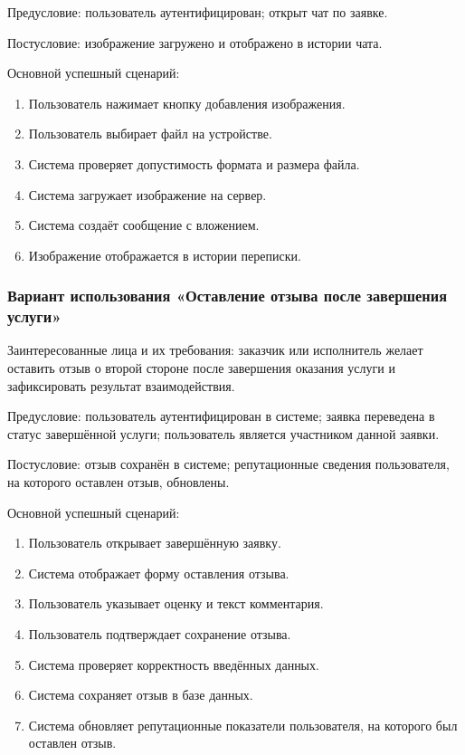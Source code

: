 Предусловие: пользователь аутентифицирован; открыт чат по заявке.

Постусловие: изображение загружено и отображено в истории чата.

Основной успешный сценарий:
\begin{enumerate}
	\item Пользователь нажимает кнопку добавления изображения.
	\item Пользователь выбирает файл на устройстве.
	\item Система проверяет допустимость формата и размера файла.
	\item Система загружает изображение на сервер.
	\item Система создаёт сообщение с вложением.
	\item Изображение отображается в истории переписки.
\end{enumerate}

\subsubsection{Вариант использования «Оставление отзыва после завершения услуги»}

Заинтересованные лица и их требования: заказчик или исполнитель желает оставить отзыв о второй стороне после завершения оказания услуги и зафиксировать результат взаимодействия.

Предусловие: пользователь аутентифицирован в системе; заявка переведена в статус завершённой услуги; пользователь является участником данной заявки.

Постусловие: отзыв сохранён в системе; репутационные сведения пользователя, на которого оставлен отзыв, обновлены.

Основной успешный сценарий:
\begin{enumerate}
	\item Пользователь открывает завершённую заявку.
	\item Система отображает форму оставления отзыва.
	\item Пользователь указывает оценку и текст комментария.
	\item Пользователь подтверждает сохранение отзыва.
	\item Система проверяет корректность введённых данных.
	\item Система сохраняет отзыв в базе данных.
	\item Система обновляет репутационные показатели пользователя, на которого был оставлен отзыв.
\end{enumerate}

